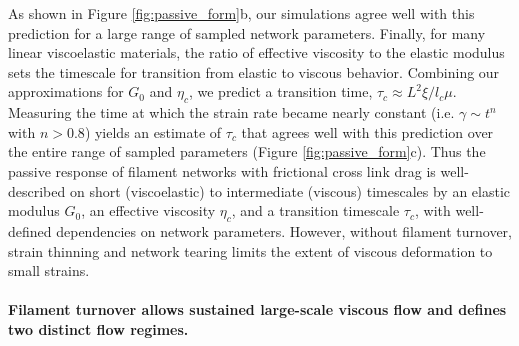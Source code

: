 \documentclass[10pt,letterpaper]{article}
\begin{document}
As shown in Figure \ref{fig:passive_form}b, our simulations agree well with this prediction for a large range of sampled network parameters. Finally, for many linear viscoelastic materials, the ratio of effective viscosity to the elastic modulus sets the timescale for transition from elastic to viscous behavior\cite{mccrum1997principles}. Combining our approximations for $G_0$ and $\eta_c$, we predict a transition time, $\tau_c \approx L^2\xi/l_c\mu$. Measuring the time at which the strain rate became nearly constant (i.e. $\gamma \sim t^n$ with $n>0.8$) yields an estimate of $\tau_c$ that agrees well with this prediction over the entire range of sampled parameters (Figure \ref{fig:passive_form}c).  Thus the passive response of filament networks with frictional cross link drag is well-described on short (viscoelastic) to intermediate (viscous) timescales by an elastic modulus $G_0$, an effective viscosity $\eta_c$, and a transition timescale $\tau_c$, with well-defined dependencies on network parameters. However, without filament turnover, strain thinning and network tearing limits the extent of viscous deformation to small strains.

\paragraph{Filament turnover allows sustained large-scale viscous flow and defines two distinct flow regimes.} 
 
\end{document}
